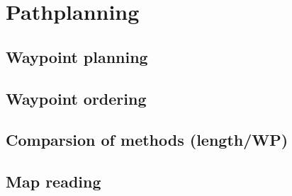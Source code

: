 \section{Pathplanning}

\subsection{Waypoint planning}

\subsection{Waypoint ordering}

\subsection{Comparsion of methods (length/WP)}

\subsection{Map reading}